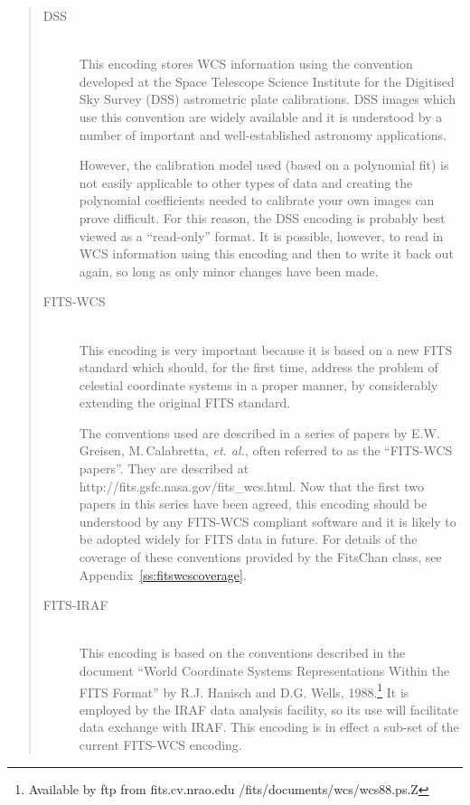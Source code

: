 \documentclass[twoside,11pt]{article}
\newcommand{\htmladdnormallink}[2]{#1}
\newcommand{\appref}[1]{Appendix~\ref{#1}}
\newcommand{\appref}[1]{\ref{#1}}
\begin{document}
\begin{quote}
\begin{description}
\item[DSS]\mbox{}\\
This encoding stores WCS information using the convention developed at
the Space Telescope Science Institute for the Digitised Sky Survey
(DSS) astrometric plate calibrations.  DSS images which use this
convention are widely available and it is understood by a number of
important and well-established astronomy applications.

However, the calibration model used (based on a polynomial fit) is not
easily applicable to other types of data and creating the polynomial
coefficients needed to calibrate your own images can prove
difficult. For this reason, the DSS encoding is probably best viewed
as a ``read-only'' format. It is possible, however, to read in WCS
information using this encoding and then to write it back out again,
so long as only minor changes have been made.

\item[FITS-WCS]\mbox{}\\
This encoding is very important because it is based on a new FITS standard 
which should, for the first time, address the problem of celestial coordinate 
systems in a proper manner, by considerably extending the original FITS 
standard.

The conventions used are described in a series of papers by
E.W.\,Greisen, M.\,Calabretta, \emph{et. al.}, often referred to as the
``FITS-WCS papers''. They are described at
\htmladdnormallink{http://fits.gsfc.nasa.gov/fits\_wcs.html}
{http://fits.gsfc.nasa.gov/fits_wcs.html}. Now that the first two papers
in this series have been agreed, this encoding should be understood by any 
FITS-WCS compliant software and it is likely to be adopted widely for FITS 
data in future.  For details of the coverage of these conventions provided
by the FitsChan class, see \appref{ss:fitswcscoverage}.

\item[FITS-IRAF]\mbox{}\\
This encoding is based on the conventions described in the document
``World Coordinate Systems Representations Within the FITS Format'' by R.J.
Hanisch and D.G. Wells, 1988.\footnote{Available by ftp from
fits.cv.nrao.edu /fits/documents/wcs/wcs88.ps.Z} It is employed
by the IRAF data analysis facility, so its use will facilitate data
exchange with IRAF. This encoding is in effect a sub-set of the current
FITS-WCS encoding.


\end{description}
\end{quote}
\end{document}
